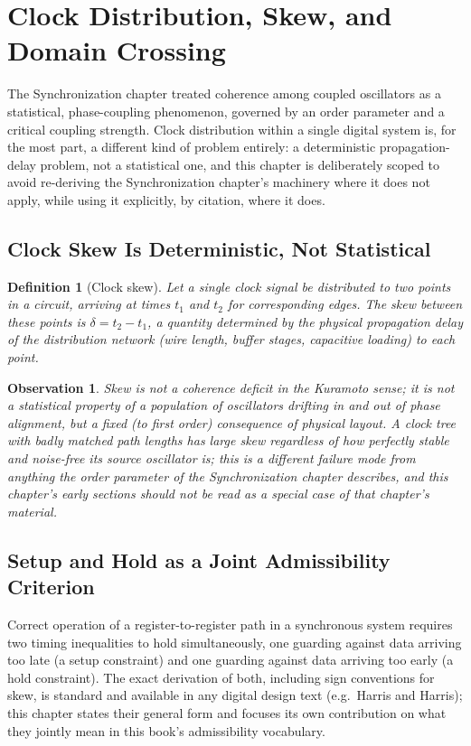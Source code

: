 \documentclass[12pt]{article}
\newtheorem{definition}{Definition}
\newtheorem{observation}{Observation}
\begin{document}
\section{Clock Distribution, Skew, and Domain Crossing}

The Synchronization chapter treated coherence among coupled oscillators as a statistical, phase-coupling phenomenon, governed by an order parameter and a critical coupling strength. Clock distribution within a single digital system is, for the most part, a different kind of problem entirely: a deterministic propagation-delay problem, not a statistical one, and this chapter is deliberately scoped to avoid re-deriving the Synchronization chapter's machinery where it does not apply, while using it explicitly, by citation, where it does.

\subsection{Clock Skew Is Deterministic, Not Statistical}

\begin{definition}[Clock skew]
Let a single clock signal be distributed to two points in a circuit, arriving at times $t_1$ and $t_2$ for corresponding edges. The skew between these points is $\delta = t_2 - t_1$, a quantity determined by the physical propagation delay of the distribution network (wire length, buffer stages, capacitive loading) to each point.
\end{definition}

\begin{observation}
Skew is not a coherence deficit in the Kuramoto sense; it is not a statistical property of a population of oscillators drifting in and out of phase alignment, but a fixed (to first order) consequence of physical layout. A clock tree with badly matched path lengths has large skew regardless of how perfectly stable and noise-free its source oscillator is; this is a different failure mode from anything the order parameter of the Synchronization chapter describes, and this chapter's early sections should not be read as a special case of that chapter's material.
\end{observation}

\subsection{Setup and Hold as a Joint Admissibility Criterion}

Correct operation of a register-to-register path in a synchronous system requires two timing inequalities to hold simultaneously, one guarding against data arriving too late (a setup constraint) and one guarding against data arriving too early (a hold constraint). The exact derivation of both, including sign conventions for skew, is standard and available in any digital design text (e.g.\ Harris and Harris); this chapter states their general form and focuses its own contribution on what they jointly mean in this book's admissibility vocabulary.
\end{document}
